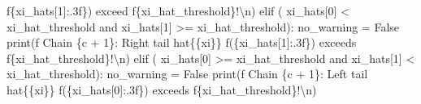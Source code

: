 \documentclass[
  letterpaper,
  DIV=11,
  numbers=noendperiod]{scrartcl}
\newenvironment{Shaded}{\begin{snugshade}}{\end{snugshade}}
\newcommand{\BuiltInTok}[1]{\textcolor[rgb]{0.00,0.23,0.31}{#1}}
\newcommand{\CharTok}[1]{\textcolor[rgb]{0.13,0.47,0.30}{#1}}
\newcommand{\ControlFlowTok}[1]{\textcolor[rgb]{0.00,0.23,0.31}{#1}}
\newcommand{\DecValTok}[1]{\textcolor[rgb]{0.68,0.00,0.00}{#1}}
\newcommand{\KeywordTok}[1]{\textcolor[rgb]{0.00,0.23,0.31}{#1}}
\newcommand{\NormalTok}[1]{\textcolor[rgb]{0.00,0.23,0.31}{#1}}
\newcommand{\OperatorTok}[1]{\textcolor[rgb]{0.37,0.37,0.37}{#1}}
\newcommand{\SpecialCharTok}[1]{\textcolor[rgb]{0.37,0.37,0.37}{#1}}
\newcommand{\SpecialStringTok}[1]{\textcolor[rgb]{0.13,0.47,0.30}{#1}}
\newcommand{\VariableTok}[1]{\textcolor[rgb]{0.07,0.07,0.07}{#1}}
\begin{document}
\begin{Shaded}
\begin{Highlighting}[]
            \SpecialStringTok{f\textquotesingle{}}\SpecialCharTok{\{}\NormalTok{xi\_hats[}\DecValTok{1}\NormalTok{]}\SpecialCharTok{:.3f\}}\SpecialStringTok{) exceed \textquotesingle{}}
            \SpecialStringTok{f\textquotesingle{}}\SpecialCharTok{\{}\NormalTok{xi\_hat\_threshold}\SpecialCharTok{\}}\SpecialStringTok{!}\CharTok{\textbackslash{}n}\SpecialStringTok{\textquotesingle{}}\NormalTok{)}
    \ControlFlowTok{elif}\NormalTok{ (    xi\_hats[}\DecValTok{0}\NormalTok{] }\OperatorTok{\textless{}}\NormalTok{ xi\_hat\_threshold }
          \KeywordTok{and}\NormalTok{ xi\_hats[}\DecValTok{1}\NormalTok{] }\OperatorTok{\textgreater{}=}\NormalTok{ xi\_hat\_threshold):}
\NormalTok{      no\_warning }\OperatorTok{=} \VariableTok{False}
      \BuiltInTok{print}\NormalTok{(}\SpecialStringTok{f\textquotesingle{}  Chain }\SpecialCharTok{\{}\NormalTok{c }\OperatorTok{+} \DecValTok{1}\SpecialCharTok{\}}\SpecialStringTok{: Right tail hat}\CharTok{\{\{}\SpecialStringTok{xi}\CharTok{\}\}}\SpecialStringTok{ \textquotesingle{}}
            \SpecialStringTok{f\textquotesingle{}(}\SpecialCharTok{\{}\NormalTok{xi\_hats[}\DecValTok{1}\NormalTok{]}\SpecialCharTok{:.3f\}}\SpecialStringTok{) exceeds \textquotesingle{}}
            \SpecialStringTok{f\textquotesingle{}}\SpecialCharTok{\{}\NormalTok{xi\_hat\_threshold}\SpecialCharTok{\}}\SpecialStringTok{!}\CharTok{\textbackslash{}n}\SpecialStringTok{\textquotesingle{}}\NormalTok{)}
    \ControlFlowTok{elif}\NormalTok{ (    xi\_hats[}\DecValTok{0}\NormalTok{] }\OperatorTok{\textgreater{}=}\NormalTok{ xi\_hat\_threshold }
          \KeywordTok{and}\NormalTok{ xi\_hats[}\DecValTok{1}\NormalTok{] }\OperatorTok{\textless{}}\NormalTok{ xi\_hat\_threshold):}
\NormalTok{      no\_warning }\OperatorTok{=} \VariableTok{False}
      \BuiltInTok{print}\NormalTok{(}\SpecialStringTok{f\textquotesingle{}  Chain }\SpecialCharTok{\{}\NormalTok{c }\OperatorTok{+} \DecValTok{1}\SpecialCharTok{\}}\SpecialStringTok{: Left tail hat}\CharTok{\{\{}\SpecialStringTok{xi}\CharTok{\}\}}\SpecialStringTok{ \textquotesingle{}}
            \SpecialStringTok{f\textquotesingle{}(}\SpecialCharTok{\{}\NormalTok{xi\_hats[}\DecValTok{0}\NormalTok{]}\SpecialCharTok{:.3f\}}\SpecialStringTok{) exceeds \textquotesingle{}}
            \SpecialStringTok{f\textquotesingle{}}\SpecialCharTok{\{}\NormalTok{xi\_hat\_threshold}\SpecialCharTok{\}}\SpecialStringTok{!}\CharTok{\textbackslash{}n}\SpecialStringTok{\textquotesingle{}}\NormalTok{)}
  

\end{Highlighting}
\end{Shaded}
\end{document}
